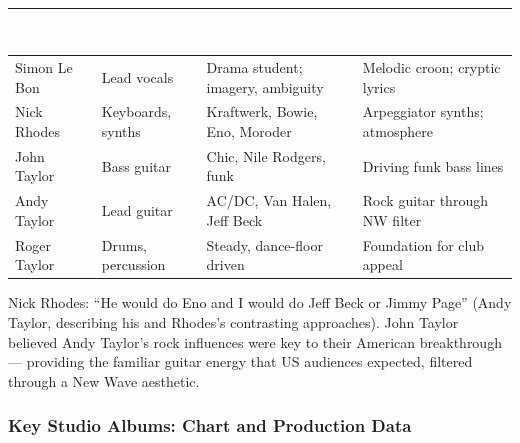 \documentclass[11pt,letterpaper]{article}
\newcommand{\tableheader}[1]{\textbf{\sffamily\textcolor{white}{#1}}}
\begin{document}
\begin{center}
\begin{tabularx}{\textwidth}{L{3cm}L{3.5cm}XL{2.5cm}}
\toprule
{}
\tableheader{Member} & \tableheader{Role} & \tableheader{Influences / Approach} & \tableheader{Sonic Contribution} \\
\midrule
Simon Le Bon & Lead vocals & Drama student; imagery, ambiguity & Melodic croon; cryptic lyrics \\
Nick Rhodes & Keyboards, synths & Kraftwerk, Bowie, Eno, Moroder & Arpeggiator synths; atmosphere \\
John Taylor & Bass guitar & Chic, Nile Rodgers, funk & Driving funk bass lines \\
Andy Taylor & Lead guitar & AC/DC, Van Halen, Jeff Beck & Rock guitar through NW filter \\
Roger Taylor & Drums, percussion & Steady, dance-floor driven & Foundation for club appeal \\
\bottomrule
\end{tabularx}
\end{center}

Nick Rhodes: ``He would do Eno and I would do Jeff Beck or Jimmy Page'' (Andy Taylor, describing his and Rhodes's contrasting approaches). John Taylor believed Andy Taylor's rock influences were key to their American breakthrough --- providing the familiar guitar energy that US audiences expected, filtered through a New Wave aesthetic.

\subsubsection{Key Studio Albums: Chart and Production Data}
\end{document}
